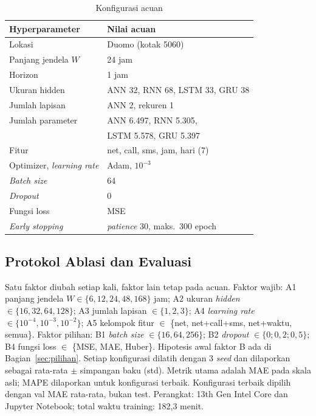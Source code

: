 \documentclass[conference,a4paper]{IEEEtran}
\newcommand{\tabkecil}{\scriptsize\setlength{\tabcolsep}{2.5pt}}
\begin{document}
\begin{table}[t]
  \centering
  \caption{Konfigurasi acuan}
  \label{tab:acuan}
  \tabkecil
  \begin{tabular}{@{}ll@{}}
    \toprule
    Hyperparameter & Nilai acuan \\
    \midrule
    Lokasi & Duomo (kotak 5060) \\
    Panjang jendela $W$ & 24 jam \\
    Horizon & 1 jam \\
    Ukuran hidden & ANN 32, RNN 68, LSTM 33, GRU 38 \\
    Jumlah lapisan & ANN 2, rekuren 1 \\
    Jumlah parameter & ANN 6.497, RNN 5.305, \\
     & LSTM 5.578, GRU 5.397 \\
    Fitur & net, call, sms, jam, hari (7) \\
    Optimizer, \textit{learning rate} & Adam, $10^{-3}$ \\
    \textit{Batch size} & 64 \\
    \textit{Dropout} & 0 \\
    Fungsi loss & MSE \\
    \textit{Early stopping} & \textit{patience} 30, maks.\ 300 epoch \\
    \bottomrule
  \end{tabular}
\end{table}
 
\subsection{Protokol Ablasi dan Evaluasi}
Satu faktor diubah setiap kali, faktor lain tetap pada acuan. Faktor wajib: A1 panjang jendela $W \in \{6, 12, 24, 48, 168\}$ jam; A2 ukuran \textit{hidden} $\in \{16, 32, 64, 128\}$; A3 jumlah lapisan $\in \{1, 2, 3\}$; A4 \textit{learning rate} $\in \{10^{-4}, 10^{-3}, 10^{-2}\}$; A5 kelompok fitur $\in$ \{net, net+call+sms, net+waktu, semua\}. Faktor pilihan: B1 \textit{batch size} $\in \{16, 64, 256\}$; B2 \textit{dropout} $\in \{0; 0{,}2; 0{,}5\}$; B4 fungsi loss $\in$ \{MSE, MAE, Huber\}. Hipotesis awal faktor B ada di Bagian~\ref{sec:pilihan}. Setiap konfigurasi dilatih dengan 3 \textit{seed} dan dilaporkan sebagai rata-rata $\pm$ simpangan baku (std). Metrik utama adalah MAE pada skala asli; MAPE dilaporkan untuk konfigurasi terbaik. Konfigurasi terbaik dipilih dengan val MAE rata-rata, bukan test. Perangkat: 13th Gen Intel Core dan Jupyter Notebook; total waktu training: 182,3 menit.
 
\end{document}
